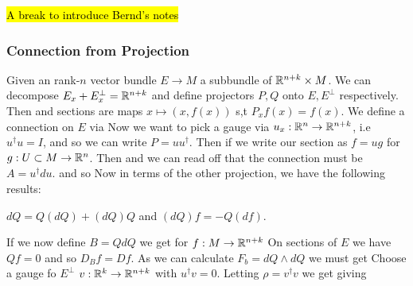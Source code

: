 \documentclass{article}
\begin{document}
\hl{A break to introduce Bernd's notes}

\subsubsection{Connection from Projection}
Given an rank-$n$ vector bundle $E \to M$ a subbundle of $\mathbb{R}^{n+k} \times M$. We can decompose $E_x + E_x^\perp = \mathbb{R}^{n+k}$ and define projectors $P,Q$ onto $E,E^\perp$ respectively. Then 
and sections are maps $x \mapsto (x,f(x))$ s,t $P_xf(x) = f(x)$. We define a connection on $E$ via 
Now we want to pick a gauge via $u_x: \mathbb{R}^n \to \mathbb{R}^{n+k}$, i.e $u^\dagger u = I$, and so we can write $P = uu^\dagger$. Then if we write our section as $f=ug$ for $g:U \subset M \to \mathbb{R}^n$. Then
and we can read off that the connection must be $A = u^\dagger du$. and so 
Now in terms of the other projection, we have the following results:
\begin{lemma}
	$dQ = Q(dQ) + (dQ)Q$ and $(dQ)f = -Q(df)$. 
\end{lemma} 
If we now define $B = QdQ$ we get for $f: M \to \mathbb{R}^{n+k}$ 
On sections of $E$ we have $Qf=0$ and so $D_B f = Df$. As we can calculate $F_b = dQ \wedge dQ$ we must get 
Choose a gauge fo $E^\perp$ $v:\mathbb{R}^k \to \mathbb{R}^{n+k}$ with $u^\dagger v= 0$. Letting $\rho = v^\dagger v$ we get 
giving 
\end{document}
